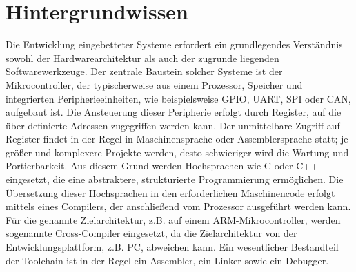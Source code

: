 \section{Hintergrundwissen}
Die Entwicklung eingebetteter Systeme erfordert ein grundlegendes Verständnis sowohl der Hardwarearchitektur als auch der zugrunde liegenden Softwarewerkzeuge.
Der zentrale Baustein solcher Systeme ist der Mikrocontroller, der typischerweise aus einem Prozessor, Speicher und integrierten Peripherieeinheiten, wie beispielsweise GPIO, UART, SPI oder CAN, aufgebaut ist.
Die Ansteuerung dieser Peripherie erfolgt durch Register, auf die über definierte Adressen zugegriffen werden kann.
Der unmittelbare Zugriff auf Register findet in der Regel in Maschinensprache oder Assemblersprache statt;
je größer und komplexere Projekte werden, desto schwieriger wird die Wartung und Portierbarkeit.
Aus diesem Grund werden Hochsprachen wie C oder C++ eingesetzt, die eine abstraktere, strukturierte Programmierung ermöglichen. 
Die Übersetzung dieser Hochsprachen in den erforderlichen Maschinencode erfolgt mittels eines Compilers, der anschließend vom Prozessor ausgeführt werden kann.
Für die genannte Zielarchitektur, z.B. auf einem ARM-Mikrocontroller, werden sogenannte Cross-Compiler eingesetzt, da die Zielarchitektur von der Entwicklungsplattform, z.B. PC, abweichen kann.
Ein wesentlicher Bestandteil der Toolchain ist in der Regel ein Assembler, ein Linker sowie ein Debugger.




























